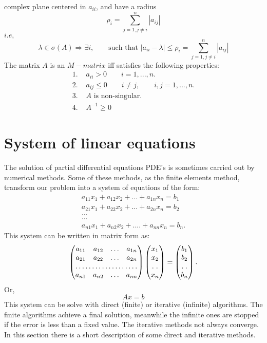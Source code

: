 \documentclass[12pt]{report}
\begin{document}
complex plane centered in $a_{ii}$, and have a radius
\begin{equation*}
 \rho_i=\sum_{j=1,j\neq i}^n |a_{ij}|
\end{equation*}
$i.e,$
\begin{equation*}
 \lambda \in \sigma (A) \Rightarrow \exists i,\qquad \text{such that } |a_{ii}-\lambda|\leq \rho_i=\sum_{j=1,j\neq i}^n |a_{ij}|
\end{equation*}
The matrix $A$ is an $M-matrix$ iff satisfies the following properties:
\begin{align*}
\text{1. } &a_{ii}>0 \qquad i=1,...,n. \\
\text{2. }&a_{ij} \leq 0 \qquad i\neq j, \qquad i, j=1,...,n. \\
\text{3. }& A \text{ is non-singular.}\\
\text{4. }&A^{-1} \geq 0
\end{align*}
\chapter{System of linear equations}
The solution of partial differential equations PDE's is sometimes carried out by numerical methods.
Some of these methods, as the finite elements method, transform our problem into a system of equations of the form:
\begin{gather*}
a_{11}x_{1}+a_{12}x_{2}+\dots+a_{1n}x_{n}=b_{1}\\
a_{21}x_{1}+a_{22}x_{2}+\dots+a_{2n}x_{n}=b_{2}\\
\dots\\
\dots\\
a_{n1}x_{1}+a_{n2}x_{2}+....+a_{nn}x_{n}=b_{n}.
\end{gather*}
This system can be written in matrix form as:
\begin{equation*}
\begin{pmatrix}
a_{11} & a_{12} & \dots & a_{1n}\\
a_{21} & a_{22} & \dots & a_{2n}\\
\hdotsfor{4}\\
a_{n1} & a_{n2} & \dots &a_{nn}
\end{pmatrix}
\begin{pmatrix}
x_{1}\\
x_{2}\\
\hdotsfor{1}\\
x_{n}
\end{pmatrix}
=
\begin{pmatrix}
b_{1}\\
b_{2}\\
\hdotsfor{1}\\
b_{n}
\end{pmatrix}.
\end{equation*}
Or,
\begin{equation}\label{ls}
Ax=b
\end{equation}
This system can be solve with direct (finite) or iterative (infinite) algorithms. The finite algorithms achieve a final solution, meanwhile the infinite ones
are stopped if the error is less than a fixed value. The iterative methods not always converge.
In this section there is a short description of some direct and iterative methods.
\end{document}
